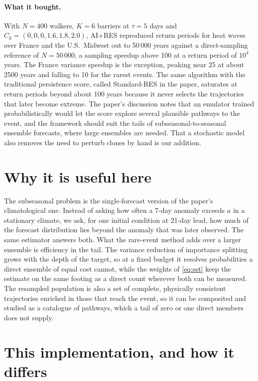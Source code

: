 \documentclass[10pt,twocolumn]{article}
\newcommand{\ck}{C_k}
\begin{document}
\paragraph{What it bought.}
With $N = 400$ walkers, $K = 6$ barriers at $\tau = 5$ days and $\ck = (0,0,0,1.6,1.8,2.0)$, AI+RES reproduced return periods for heat waves over France and the U.S.\ Midwest out to 50\,000 years against a direct-sampling reference of $N = 50\,000$, a sampling speedup above 100 at a return period of $10^4$ years. The France variance speedup is the exception, peaking near 25 at about 2500 years and falling to 10 for the rarest events. The same algorithm with the traditional persistence score, called Standard-RES in the paper, saturates at return periods beyond about 100 years because it never selects the trajectories that later become extreme. The paper's discussion notes that an emulator trained probabilistically would let the score explore several plausible pathways to the event, and the framework should suit the tails of subseasonal-to-seasonal ensemble forecasts, where large ensembles are needed. That a stochastic model also removes the need to perturb clones by hand is our addition.

\section{Why it is useful here}
\label{sec:useful}

The subseasonal problem is the single-forecast version of the paper's climatological one. Instead of asking how often a 7-day anomaly exceeds $a$ in a stationary climate, we ask, for one initial condition at 21-day lead, how much of the forecast distribution lies beyond the anomaly that was later observed. The same estimator answers both. What the rare-event method adds over a larger ensemble is efficiency in the tail. The variance reduction of importance splitting grows with the depth of the target, so at a fixed budget it resolves probabilities a direct ensemble of equal cost cannot, while the weights of \cref{eq:est} keep the estimate on the same footing as a direct count wherever both can be measured. The resampled population is also a set of complete, physically consistent trajectories enriched in those that reach the event, so it can be composited and studied as a catalogue of pathways, which a tail of zero or one direct members does not supply.

\section{This implementation, and how it differs}
\label{sec:impl}
\end{document}
